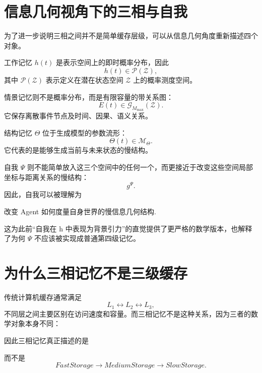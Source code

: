 \section{信息几何视角下的三相与自我}

为了进一步说明三相之间并不是简单缓存层级，可以从信息几何角度重新描述四个对象。

工作记忆 $h(t)$ 是表示空间上的即时概率分布，因此
\[
h(t)
\in
\mathcal{P}(\mathcal{Z}),
\]
其中 $\mathcal{P}(\mathcal{Z})$ 表示定义在潜在状态空间 $\mathcal{Z}$ 上的概率测度空间。

情景记忆则不是概率分布，而是有限容量的带关系图：
\[
E(t)
\in
\mathcal{G}_{M_{\max}}(\mathcal{Z}).
\]
它保存离散事件节点及时间、因果、语义关系。

结构记忆 $\Theta$ 位于生成模型的参数流形：
\[
\Theta(t)
\in
\mathcal{M}_\Theta.
\]
它代表的是能够生成当前与未来状态的慢结构。

自我 $\Psi$ 则不能简单放入这三个空间中的任何一个，而更接近于改变这些空间局部坐标与距离关系的慢结构：
\[
g^\Psi.
\]
因此，自我可以被理解为
\begin{statementbox}
改变 Agent 如何度量自身世界的慢信息几何结构.
\end{statementbox}
这为此前“自我在 h 中表现为背景引力”的直觉提供了更严格的数学版本，也解释了为何 $\Psi$ 不应该被实现成普通第四级记忆。

\section{为什么三相记忆不是三级缓存}

传统计算机缓存通常满足
\[
L_1
\leftrightarrow
L_2
\leftrightarrow
L_3,
\]
不同层之间主要区别在访问速度和容量。而三相记忆不是这种关系，因为三者的数学对象本身不同：
\begin{statementbox}
\centering
{}
\end{statementbox}
\begin{statementbox}
\centering
{}
\end{statementbox}
\begin{statementbox}
\centering
{}
\end{statementbox}
因此三相记忆真正描述的是
\begin{statementbox}
\centering
{}
\end{statementbox}
而不是
\[
FastStorage
\rightarrow
MediumStorage
\rightarrow
SlowStorage.
\]

